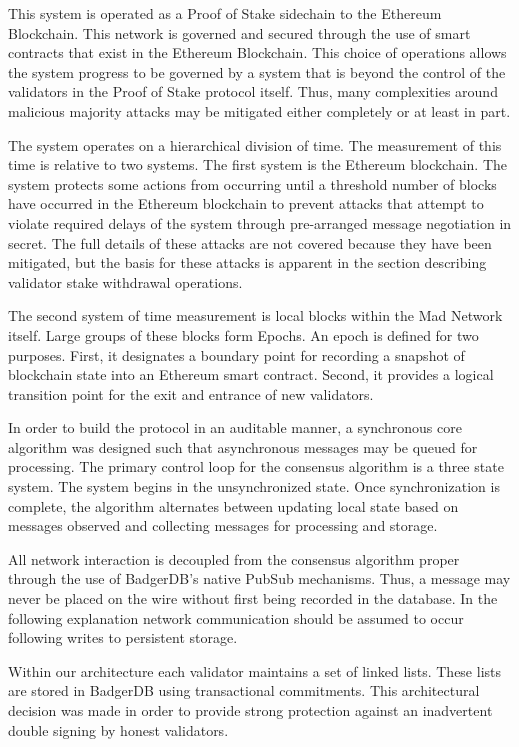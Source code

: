 This system is operated as a Proof of Stake sidechain to the Ethereum
Blockchain.
This network is governed and secured through the use of smart contracts
that exist in the Ethereum Blockchain.
This choice of operations allows the system progress to be governed by
a system that is beyond the control of the validators in the Proof of
Stake protocol itself.
Thus, many complexities around malicious majority attacks may be
mitigated either completely or at least in part.

The system operates on a hierarchical division of time.
The measurement of this time is relative to two systems.
The first system is the Ethereum blockchain.
The system protects some actions from occurring until a threshold
number of blocks have occurred in the Ethereum blockchain to prevent
attacks that attempt to violate required delays of the system through
pre-arranged message negotiation in secret.
The full details of these attacks are not covered because they have
been mitigated, but the basis for these attacks is apparent in the
section describing validator stake withdrawal operations.

The second system of time measurement is local blocks within the Mad
Network itself.
Large groups of these blocks form Epochs.
An epoch is defined for two purposes.
First, it designates a boundary point for recording a snapshot of
blockchain state into an Ethereum smart contract.
Second, it provides a logical transition point for the exit and
entrance of new validators.

In order to build the protocol in an auditable manner, a synchronous
core algorithm was designed such that asynchronous messages may be
queued for processing.
The primary control loop for the consensus algorithm is a three state
system.
The system begins in the unsynchronized state.
Once synchronization is complete, the algorithm alternates between
updating local state based on messages observed and collecting messages
for processing and storage.

All network interaction is decoupled from the consensus algorithm
proper through the use of BadgerDB's native PubSub mechanisms.
Thus, a message may never be placed on the wire without first being
recorded in the database.
In the following explanation network communication should be assumed to
occur following writes to persistent storage.

Within our architecture each validator maintains a set of linked lists.
These lists are stored in BadgerDB using transactional commitments.
This architectural decision was made in order to provide strong
protection against an inadvertent double signing by honest validators.

